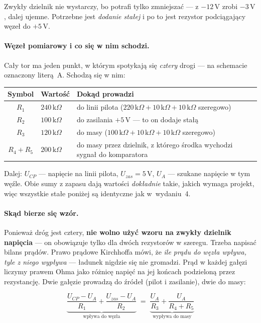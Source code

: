 \documentclass[a4paper,11pt]{article}
\newcommand{\kohm}{\,\mathrm{k}\Omega}
\newcommand{\volt}{\,\mathrm{V}}
\begin{document}
Zwykły dzielnik nie wystarczy, bo potrafi tylko zmniejszać --- z $-12\volt$ zrobi
$-3\volt$, dalej ujemne. Potrzebne jest \emph{dodanie stałej} i po to jest rezystor
podciągający węzeł do $+5\volt$.

\paragraph{Węzeł pomiarowy i co się w nim schodzi.} Cały tor ma jeden punkt,
w którym spotykają się \emph{cztery} drogi --- na schemacie oznaczony literą~A.
Schodzą się w nim:

\begin{center}
\begin{tabular}{clp{7.4cm}}
\toprule
Symbol & Wartość & Dokąd prowadzi \\
\midrule
$R_1$ & $240\kohm$ & do linii pilota ($220\kohm+10\kohm+10\kohm$ szeregowo) \\
$R_2$ & $100\kohm$ & do zasilania $+5\volt$ --- to on dodaje stałą \\
$R_3$ & $120\kohm$ & do masy ($100\kohm+10\kohm+10\kohm$ szeregowo) \\
$R_4+R_5$ & $200\kohm$ & do masy przez dzielnik, z którego środka wychodzi sygnał
  do komparatora \\
\bottomrule
\end{tabular}
\end{center}

Dalej: $U_{CP}$ --- napięcie na linii pilota, $U_{zas}=5\volt$, $U_A$ --- szukane
napięcie w tym węźle. Obie sumy z zapasu dają wartości \emph{dokładnie} takie, jakich
wymaga projekt, więc wszystkie stałe poniżej są identyczne jak w~wydaniu~4.

\paragraph{Skąd bierze się wzór.} Ponieważ dróg jest cztery, \textbf{nie wolno użyć
wzoru na zwykły dzielnik napięcia} --- on obowiązuje tylko dla dwóch rezystorów
w szeregu. Trzeba napisać bilans prądów. Prawo prądowe Kirchhoffa mówi, że
\emph{ile prądu do węzła wpływa, tyle z niego wypływa} --- ładunek nigdzie się nie
gromadzi. Prąd w każdej gałęzi liczymy prawem Ohma jako różnicę napięć na jej
końcach podzieloną przez rezystancję. Dwie gałęzie prowadzą do źródeł (pilot
i zasilanie), dwie do masy:

\begin{equation}
\underbrace{\frac{U_{CP}-U_A}{R_1}+\frac{U_{zas}-U_A}{R_2}}_{\text{wpływa do węzła}}
\;=\;
\underbrace{\frac{U_A}{R_3}+\frac{U_A}{R_4+R_5}}_{\text{wypływa do masy}}
\label{eq:bilans}
\end{equation}
\end{document}
